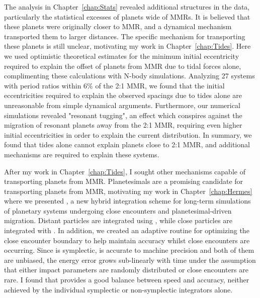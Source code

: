 The analysis in Chapter~\ref{chap:Stats} revealed additional structures in the \kep data, particularly the statistical excesses of planets wide of MMRs.
It is believed that these planets were originally closer to MMR, and a dynamical mechanism transported them to larger distances.
The specific mechanism for transporting these planets is still unclear, motivating my work in Chapter~\ref{chap:Tides}.
Here we used optimistic theoretical estimates for the minimum initial eccentricity required to explain the offset of \kep planets from MMR due to tidal forces alone, complimenting these calculations with N-body simulations.
Analyzing 27 \kep systems with period ratios within $6\%$ of the 2:1 MMR, we found that the initial eccentricities required to explain the observed spacings due to tides alone are unreasonable from simple dynamical arguments.
Furthermore, our numerical simulations revealed "resonant tugging", an effect which conspires against the migration of resonant planets away from the 2:1 MMR, requiring even higher initial eccentricities in order to explain the current \kep distribution. 
In summary, we found that tides alone cannot explain planets close to 2:1 MMR, and additional mechanisms are required to explain these systems. 

After my work in Chapter~\ref{chap:Tides}, I sought other mechanisms capable of transporting planets from MMR. 
Planetesimals are a promising candidate for transporting planets from MMR, motivating my work in Chapter~\ref{chap:Hermes} where we presented \hermes, a new hybrid integration scheme for long-term simulations of planetary systems undergoing close encounters and planetesimal-driven migration. 
Distant particles are integrated using \whfast, while close particles are integrated with \ias.
In addition, we created an adaptive routine for optimizing the close encounter boundary to help maintain accuracy whilst close encounters are occurring.
Since \whfast is symplectic, \ias is accurate to machine precision and both of them are unbiased, the energy error grows sub-linearly with time under the assumption that either impact parameters are randomly distributed or close encounters are rare.
I found that \hermes provides a good balance between speed and accuracy, neither achieved by the individual symplectic or non-symplectic integrators alone.

